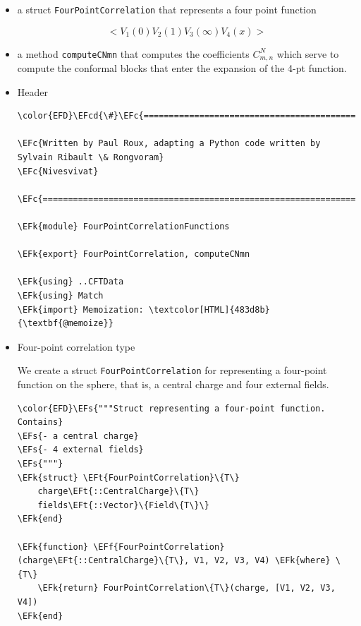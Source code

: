 \documentclass[a4paper]{article}
\numberwithin{equation}{section}
\newcommand{\EFc}[1]{\textcolor{EFc}{#1}} %
\newcommand{\EFcd}[1]{\textcolor{EFcd}{#1}} %
\newcommand{\EFs}[1]{\textcolor{EFs}{#1}} %
\newcommand{\EFk}[1]{\textcolor{EFk}{#1}} %
\newcommand{\EFf}[1]{\textcolor{EFf}{#1}} %
\newcommand{\EFt}[1]{\textcolor{EFt}{#1}} %
\begin{document}
\begin{itemize}
\item a struct \texttt{FourPointCorrelation} that represents a four point function

\[
  < V_1(0) V_2(1) V_3(\infty) V_4(x)>
  \]

\item a method \texttt{computeCNmn} that computes the coefficients \(C^N_{m,n}\) which serve to compute the conformal blocks that enter the expansion of the 4-pt function.
\end{itemize}
\begin{itemize}
\item Header
\label{sec:org1fb80ab}

\begin{Code}
\begin{Verbatim}
\color{EFD}\EFcd{\#}\EFc{===========================================================================================}

\EFc{Written by Paul Roux, adapting a Python code written by Sylvain Ribault \& Rongvoram}
\EFc{Nivesvivat}

\EFc{===========================================================================================\#}

\EFk{module} FourPointCorrelationFunctions

\EFk{export} FourPointCorrelation, computeCNmn

\EFk{using} ..CFTData
\EFk{using} Match
\EFk{import} Memoization: \textcolor[HTML]{483d8b}{\textbf{@memoize}}
\end{Verbatim}
\end{Code}
\item Four-point correlation type
\label{sec:orgfe72d7b}

We create a struct \texttt{FourPointCorrelation} for representing a four-point function on the sphere, that is, a central charge and four external fields.

\begin{Code}
\begin{Verbatim}
\color{EFD}\EFs{"""Struct representing a four-point function. Contains}
\EFs{- a central charge}
\EFs{- 4 external fields}
\EFs{"""}
\EFk{struct} \EFt{FourPointCorrelation}\{T\}
    charge\EFt{::CentralCharge}\{T\}
    fields\EFt{::Vector}\{Field\{T\}\}
\EFk{end}

\EFk{function} \EFf{FourPointCorrelation}(charge\EFt{::CentralCharge}\{T\}, V1, V2, V3, V4) \EFk{where} \{T\}
    \EFk{return} FourPointCorrelation\{T\}(charge, [V1, V2, V3, V4])
\EFk{end}


\end{Verbatim}
\end{Code}
\end{itemize}
\end{document}
